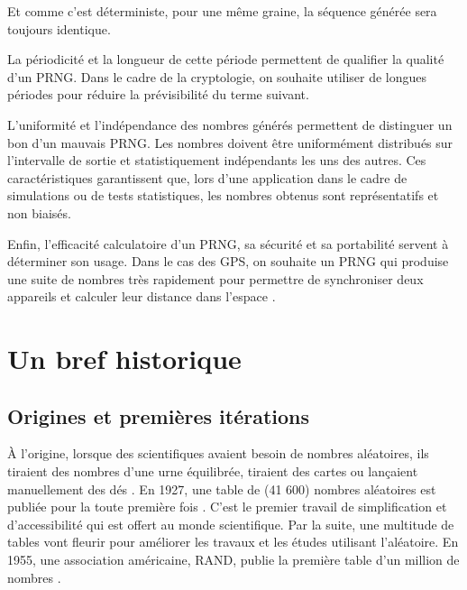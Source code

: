 \documentclass[9pt,a4paper,twoside,english]{class/backend}
\begin{document}
    Et comme c'est déterministe, pour une même graine, la séquence générée sera toujours identique.

    \smallskip

    La périodicité et la longueur de cette période permettent de qualifier la qualité d'un PRNG. Dans le cadre de la cryptologie, on souhaite utiliser de longues périodes pour réduire la prévisibilité du terme suivant.
    
    L'uniformité et l'indépendance des nombres générés permettent de distinguer un bon d'un mauvais PRNG. Les nombres doivent être uniformément distribués sur l'intervalle de sortie et statistiquement indépendants les uns des autres. Ces caractéristiques garantissent que, lors d'une application dans le cadre de simulations ou de tests statistiques, les nombres obtenus sont représentatifs et non biaisés.
    
    Enfin, l'efficacité calculatoire d'un PRNG, sa sécurité et sa portabilité servent à déterminer son usage. Dans le cas des GPS, on souhaite un PRNG qui produise une suite de nombres très rapidement pour permettre de synchroniser deux appareils et calculer leur distance dans l'espace \cite{Wiki}.


\section{Un bref historique}

    \subsection{Origines et premières itérations}\smallskip

    \hspace{10pt}À l'origine, lorsque des scientifiques avaient besoin de nombres aléatoires, ils tiraient des nombres d'une urne équilibrée, tiraient des cartes ou lançaient manuellement des dés \cite{RefGen}. En 1927, une table de (41 600) nombres aléatoires est publiée pour la toute première fois \cite{historique}. C'est le premier travail de simplification et d'accessibilité qui est offert au monde scientifique. Par la suite, une multitude de tables vont fleurir pour améliorer les travaux et les études utilisant l'aléatoire. En 1955, une association américaine, RAND, publie la première table d'un million de nombres \cite{RAND}.
    
\end{document}
